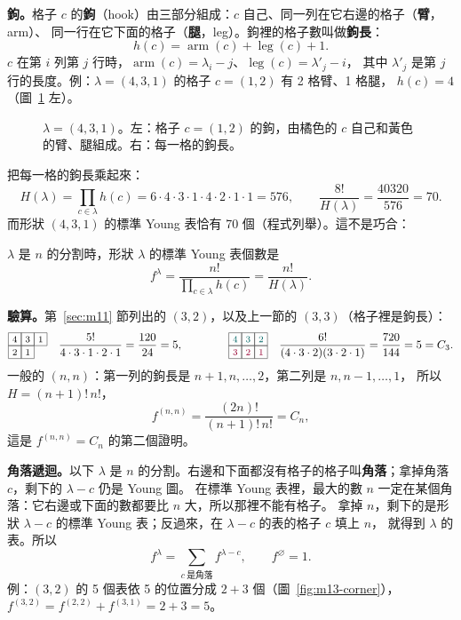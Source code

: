 \textbf{鉤。}格子 $c$ 的\textbf{鉤}（hook）由三部分組成：$c$ 自己、同一列在它右邊的格子（\textbf{臂}，arm）、
同一行在它下面的格子（\textbf{腿}，leg）。鉤裡的格子數叫做\textbf{鉤長}：
\[
h(c)=\operatorname{arm}(c)+\operatorname{leg}(c)+1 .
\]
$c$ 在第 $i$ 列第 $j$ 行時，$\operatorname{arm}(c)=\lambda_i-j$、$\operatorname{leg}(c)=\lambda'_j-i$，
其中 $\lambda'_j$ 是第 $j$ 行的長度。例：$\lambda=(4,3,1)$ 的格子 $c=(1,2)$ 有 2 格臂、1 格腿，
$h(c)=4$（圖~\ref{fig:m13-hook} 左）。

\begin{figure}[H]
\centering
\FigMXIIIHook
\caption{$\lambda=(4,3,1)$。左：格子 $c=(1,2)$ 的鉤，由\textcolor{cTop}{橘色的 $c$ 自己}和黃色的臂、腿組成。右：每一格的鉤長。}
\label{fig:m13-hook}
\end{figure}

把每一格的鉤長乘起來：
\[
H(\lambda)=\prod_{c\in\lambda}h(c)=6\cdot4\cdot3\cdot1\cdot4\cdot2\cdot1\cdot1=576,\qquad
\frac{8!}{H(\lambda)}=\frac{40320}{576}=70 .
\]
而形狀 $(4,3,1)$ 的標準 Young 表恰有 70 個（程式列舉）。這不是巧合：

\begin{thmbox}
$\lambda$ 是 $n$ 的分割時，形狀 $\lambda$ 的標準 Young 表個數是
\begin{equation}\label{eq:m13-hook}
f^{\lambda}=\frac{n!}{\prod_{c\in\lambda}h(c)}=\frac{n!}{H(\lambda)} .
\end{equation}
\end{thmbox}

\textbf{驗算。}第~\ref{sec:m11} 節列出的 $(3,2)$，以及上一節的 $(3,3)$（格子裡是鉤長）：
\[
\FigMXIIIHookSmall\quad \frac{5!}{4\cdot3\cdot1\cdot2\cdot1}=\frac{120}{24}=5,
\qquad\qquad
\FigMXIIIHookSquare\quad \frac{6!}{(4\cdot3\cdot2)(3\cdot2\cdot1)}=\frac{720}{144}=5=C_3 .
\]
一般的 $(n,n)$：第一列的鉤長是 \textcolor{cLeft}{$n+1,n,\ldots,2$}，第二列是 \textcolor{cRight}{$n,n-1,\ldots,1$}，
所以 $H=(n+1)!\,n!$，
\[
f^{(n,n)}=\frac{(2n)!}{(n+1)!\,n!}=C_n ,
\]
這是 $f^{(n,n)}=C_n$ 的第二個證明。

\textbf{角落遞迴。}以下 $\lambda$ 是 $n$ 的分割。右邊和下面都沒有格子的格子叫\textbf{角落}；拿掉角落 $c$，剩下的 $\lambda-c$ 仍是 Young 圖。
在標準 Young 表裡，最大的數 $n$ 一定在某個角落：它右邊或下面的數都要比 $n$ 大，所以那裡不能有格子。
拿掉 $n$，剩下的是形狀 $\lambda-c$ 的標準 Young 表；反過來，在 $\lambda-c$ 的表的格子 $c$ 填上 $n$，
就得到 $\lambda$ 的表。所以
\begin{equation}\label{eq:m13-corner}
f^{\lambda}=\sum_{c\ \text{是角落}}f^{\lambda-c},\qquad f^{\varnothing}=1 .
\end{equation}
例：$(3,2)$ 的 5 個表依 5 的位置分成 $2+3$ 個（圖~\ref{fig:m13-corner}），
$f^{(3,2)}=f^{(2,2)}+f^{(3,1)}=2+3=5$。

